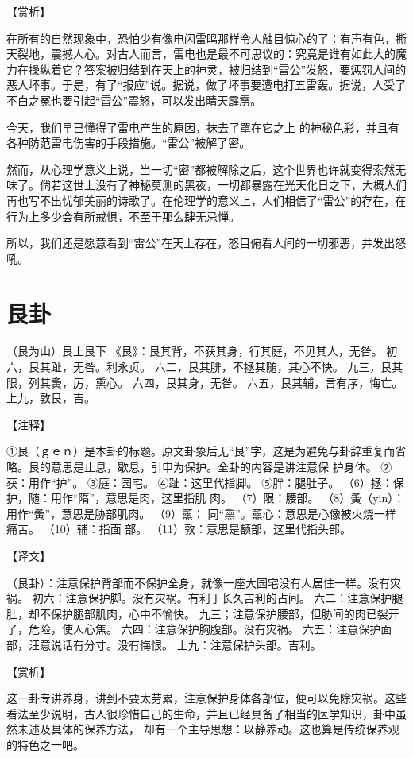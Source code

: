 \documentclass[a4paper,12pt,UTF8,twoside]{ctexbook}
\begin{document}
【赏析】

在所有的自然现象中，恐怕少有像电闪雷鸣那样令人触目惊心的了：有声有色，撕天裂地，震撼人心。对古人而言，雷电也是最不可思议的：究竟是谁有如此大的魔力在操纵着它？答案被归结到在天上的神灵，被归结到“雷公”发怒，要惩罚人间的恶人坏事。于是，有了“报应”说。据说，做了坏事要遭电打五雷轰。据说，人受了不白之冤也要引起“雷公”震怒，可以发出晴天霹雳。

今天，我们早已懂得了雷电产生的原因，抹去了罩在它之上 的神秘色彩，并且有各种防范雷电伤害的手段措施。“雷公”被解了密。

然而，从心理学意义上说，当一切“密”都被解除之后，这个世界也许就变得索然无味了。倘若这世上没有了神秘莫测的黑夜，一切都暴露在光天化日之下，大概人们再也写不出忧郁美丽的诗歌了。在伦理学的意义上，人们相信了“雷公”的存在，在行为上多少会有所戒惧，不至于那么肆无忌惮。

所以，我们还是愿意看到“雷公”在天上存在，怒目俯看人间的一切邪恶，并发出怒吼。

\chapter{艮卦}

（艮为山）艮上艮下
《艮》：艮其背，不获其身，行其庭，不见其人，无咎。
初六，艮其趾，无咎。利永贞。
六二，艮其腓，不拯其随，其心不快。
九三，艮其限，列其夤，厉，熏心。
六四，艮其身，无咎。
六五，艮其辅，言有序，悔亡。
上九，敦艮，吉。

【注释】

①艮（ｇｅｎ）是本卦的标题。原文卦象后无“艮”字，这是为避免与卦辞重复而省略。艮的意思是止息，歇息，引申为保护。全卦的内容是讲注意保 护身体。
②获：用作“护”。
③庭：园宅。
④趾：这里代指脚。
⑤胖：腿肚子。
（6）拯：保护，随：用作“隋”，意思是肉，这里指肌 肉。
（7）限：腰部。
（8）夤（yin）：用作“夤”，意思是胁部肌肉。
（9）薰： 同“熏”。薰心：意思是心像被火烧一样痛苦。
（10）辅：指面 部。
（11）敦：意思是额部，这里代指头部。

【译文】

（艮卦）：注意保护背部而不保护全身，就像一座大园宅没有人居住一样。没有灾祸。
初六：注意保护脚。没有灾祸。有利于长久吉利的占间。
六二：注意保护腿肚，却不保护腿部肌肉，心中不愉快。
九三；注意保护腰部，但胁间的肉已裂开了，危险，使人心焦。
六四：注意保护胸腹部。没有灾祸。
六五：注意保护面部，汪意说话有分寸。没有悔恨。
上九：注意保护头部。吉利。

【赏析】

这一卦专讲养身，讲到不要太劳累，注意保护身体各部位，便可以免除灾祸。这些看法至少说明，古人很珍惜自己的生命，并且已经具备了相当的医学知识，卦中虽然未述及具体的保养方法， 却有一个主导思想：以静养动。这也算是传统保养观的特色之一吧。
\end{document}
